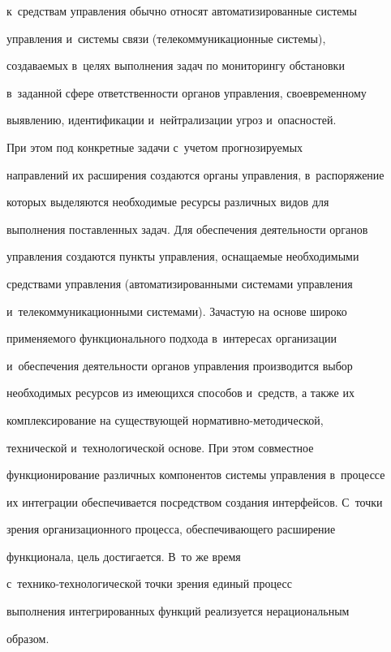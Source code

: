 к~средствам управ\-ле\-ния обычно относят автоматизированные сис\-те\-мы 


управ\-ле\-ния и~сис\-те\-мы связи (телекоммуникационные сис\-те\-мы), 


создаваемых в~целях выполнения задач по мониторингу обстановки 


в~заданной сфере ответственности органов управления, своевременному 


выявлению, идентификации и~нейтрализации угроз и~опасностей.


      


      При этом под конкретные задачи с~учетом прогнозируемых 


направлений их расширения создаются органы управления, в~распоряжение 


которых выделяются необходимые ресурсы различных видов для 


выполнения поставленных задач. Для обеспечения деятельности органов 


управления создаются пункты управления, оснащаемые необходимыми 


средствами управления (автоматизированными системами управления 


и~телекоммуникационными системами). Зачастую на основе широко 


применяемого функционального подхода в~интересах организации 


и~обеспечения деятельности органов управления производится выбор 


необходимых ресурсов из имеющихся способов и~средств, а также их 


комплексирование на существующей нор\-ма\-тив\-но-ме\-то\-ди\-че\-ской, 


технической и~технологической основе. При этом совместное 


функционирование различных компонентов системы управления в~процессе 


их интеграции обеспечивается посредством создания интерфейсов. С~точки 


зрения организационного процесса, обеспечивающего расширение 


функционала, цель достигается. В~то же время  


с~тех\-ни\-ко-тех\-но\-ло\-ги\-че\-ской точки зрения единый процесс 


выполнения интегрированных функций реализуется нерациональным 


образом. 


